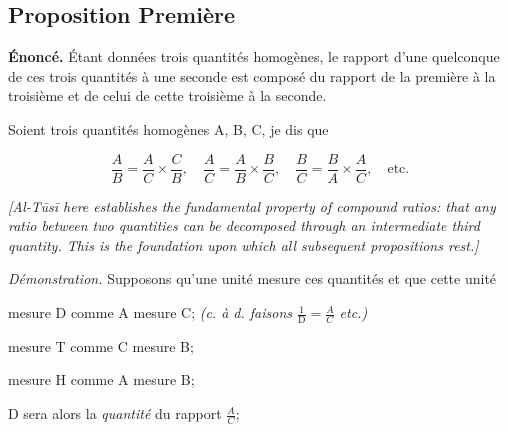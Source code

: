 \documentclass[11pt,a4paper]{article}
\theoremstyle{plain}
\theoremstyle{definition}
\theoremstyle{remark}
\begin{document}



\subsection{Proposition Première}

\label{prop:1}





\textbf{Énoncé.} Étant données trois quantités homogènes, le rapport d'une quelconque de ces trois quantités à une seconde est composé du rapport de la première à la troisième et de celui de cette troisième à la seconde.



Soient trois quantités homogènes A, B, C, je dis que

\[

\frac{A}{B} = \frac{A}{C} \times \frac{C}{B}, \quad

\frac{A}{C} = \frac{A}{B} \times \frac{B}{C}, \quad

\frac{B}{C} = \frac{B}{A} \times \frac{A}{C}, \quad \text{etc.}

\]





\noindent\textit{[Al-Tūsī here establishes the fundamental property of compound ratios: that any ratio between two quantities can be decomposed through an intermediate third quantity. This is the foundation upon which all subsequent propositions rest.]}





\textit{Démonstration.} Supposons qu'une unité mesure ces quantités et que cette unité



mesure D comme A mesure C; \textit{(c. à d. faisons $\frac{1}{\mathrm{D}} = \frac{A}{C}$ etc.)}



mesure T comme C mesure B;



mesure H comme A mesure B;



D sera alors la \textit{quantité} du rapport $\frac{A}{C}$;
\end{document}
